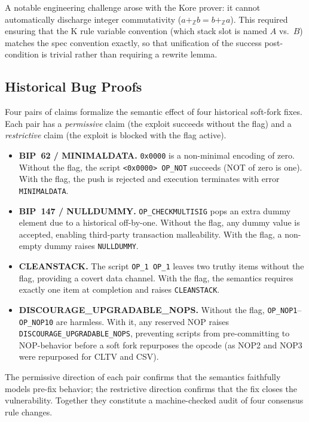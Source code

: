 \documentclass[conference]{IEEEtran}
\begin{document}
A notable engineering challenge arose with the Kore prover: it cannot
automatically discharge integer commutativity ($a +_{\mathbb{Z}} b =
b +_{\mathbb{Z}} a$).  This required ensuring that the K rule variable
convention (which stack slot is named $A$ vs.\ $B$) matches the spec convention
exactly, so that unification of the success post-condition is trivial rather
than requiring a rewrite lemma.

\subsection{Historical Bug Proofs}

Four pairs of claims formalize the semantic effect of four historical soft-fork
fixes.  Each pair has a \emph{permissive} claim (the exploit succeeds without
the flag) and a \emph{restrictive} claim (the exploit is blocked with the flag
active).

\begin{itemize}
  \item \textbf{BIP~62 / MINIMALDATA.}  \texttt{0x0000} is a non-minimal
  encoding of zero.  Without the flag, the script \texttt{<0x0000> OP\_NOT}
  succeeds (NOT of zero is one).  With the flag, the push is rejected and
  execution terminates with error \texttt{MINIMALDATA}.

  \item \textbf{BIP~147 / NULLDUMMY.}  \texttt{OP\_CHECKMULTISIG} pops an
  extra dummy element due to a historical off-by-one.  Without the flag, any
  dummy value is accepted, enabling third-party transaction malleability.  With
  the flag, a non-empty dummy raises \texttt{NULLDUMMY}.

  \item \textbf{CLEANSTACK.}  The script \texttt{OP\_1 OP\_1} leaves two truthy
  items without the flag, providing a covert data channel.  With the flag, the
  semantics requires exactly one item at completion and raises
  \texttt{CLEANSTACK}.

  \item \textbf{DISCOURAGE\_UPGRADABLE\_NOPS.}  Without the flag,
  \texttt{OP\_NOP1}--\texttt{OP\_NOP10} are harmless.  With it, any reserved
  NOP raises \texttt{DISCOURAGE\_UPGRADABLE\_NOPS}, preventing scripts from
  pre-committing to NOP-behavior before a soft fork repurposes the opcode (as
  NOP2 and NOP3 were repurposed for CLTV and CSV).
\end{itemize}

The permissive direction of each pair confirms that the semantics faithfully
models pre-fix behavior; the restrictive direction confirms that the fix closes
the vulnerability.  Together they constitute a machine-checked audit of four
consensus rule changes.
\end{document}
